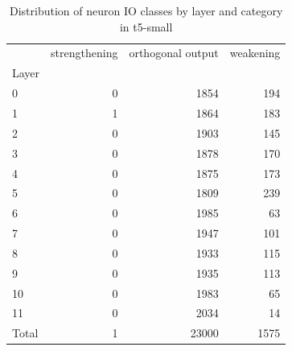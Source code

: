\begin{table}
\caption{Distribution of neuron IO classes by layer and category in t5-small}
\label{tab:t5-small}
\begin{tabular}{lrrr}
 & strengthening & orthogonal output & weakening \\
Layer &  &  &  \\
0 & 0 & 1854 & 194 \\
1 & 1 & 1864 & 183 \\
2 & 0 & 1903 & 145 \\
3 & 0 & 1878 & 170 \\
4 & 0 & 1875 & 173 \\
5 & 0 & 1809 & 239 \\
6 & 0 & 1985 & 63 \\
7 & 0 & 1947 & 101 \\
8 & 0 & 1933 & 115 \\
9 & 0 & 1935 & 113 \\
10 & 0 & 1983 & 65 \\
11 & 0 & 2034 & 14 \\
Total & 1 & 23000 & 1575 \\
\end{tabular}
\end{table}
